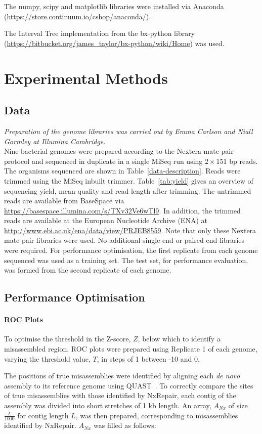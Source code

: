 The numpy, scipy and matplotlib libraries were installed via Anaconda (\url{https://store.continuum.io/cshop/anaconda/}).

The Interval Tree implementation from the bx-python library (\url{https://bitbucket.org/james_taylor/bx-python/wiki/Home}) was used.   

\section{Experimental Methods}
\subsection{Data}
\textit{Preparation of the genome libraries was carried out by Emma Carlson and Niall Gormley at Illumina Cambridge.} \\
Nine bacterial genomes were prepared according to the Nextera mate pair protocol and sequenced in duplicate in a single MiSeq run using $2 \times 151$ bp reads. The organisms sequenced are shown in Table~\ref{data-description}. Reads were trimmed using the MiSeq inbuilt trimmer. Table~\ref{tab:yield} gives an overview of sequencing yield, mean quality and read length after trimming. The untrimmed reads are available from BaseSpace via \url{https://basespace.illumina.com/s/TXv32Ve6wTl9}. In addition,
the trimmed reads are available at the European Nucleotide Archive (ENA) at \url{http://www.ebi.ac.uk/ena/data/view/PRJEB8559}. Note that only these Nextera mate pair libraries were used. No additional single end or paired end libraries were required. For performance optimisation, the first replicate from each genome sequenced was used as a training set. The test set, for performance evaluation, was formed from the second replicate of each genome. 

\subsection{Performance Optimisation}
\label{sect:optimisation}
\paragraph*{ROC Plots}
To optimise the threshold in the Z-score, $Z$, below which to identify a misassembled region, ROC plots were prepared using Replicate 1 of each genome, varying the threshold value, $T$, in steps of 1 between -10 and 0. 

The positions of true misassemblies were identified by aligning each \textit{de novo} assembly to its reference genome using QUAST~\cite{Gurevich2013}. To correctly compare the sites of true misassemblies with those identified by NxRepair, each contig of the assembly was divided into short stretches of 1 kb length. An array, $A_{Nx}$ of size $\frac{L}{1000}$ for contig length $L$, was then prepared, corresponding to misassemblies identified by NxRepair. $A_{Nx}$ was filled as follows:

